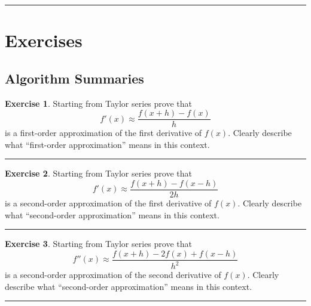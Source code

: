 \documentclass[
]{book}
\theoremstyle{definition}
\theoremstyle{definition}
\theoremstyle{definition}
\newtheorem{exercise}{Exercise}[chapter]
\theoremstyle{remark}
\begin{document}
\begin{center}\rule{0.5\linewidth}{0.5pt}\end{center}

\hypertarget{exercises-2}{%
\section{Exercises}\label{exercises-2}}

\hypertarget{algorithm-summaries-1}{%
\subsection{Algorithm Summaries}\label{algorithm-summaries-1}}

\begin{exercise}
\protect\hypertarget{exr:unnamed-chunk-249}{}{\label{exr:unnamed-chunk-249} }Starting from Taylor series prove that
\[f'(x) \approx \frac{f(x+h) - f(x)}{h}\] is a first-order approximation
of the first derivative of \(f(x)\). Clearly describe what ``first-order
approximation'' means in this context.
\end{exercise}

\begin{center}\rule{0.5\linewidth}{0.5pt}\end{center}

\begin{exercise}
\protect\hypertarget{exr:unnamed-chunk-250}{}{\label{exr:unnamed-chunk-250} }Starting from Taylor series prove that
\[f'(x) \approx \frac{f(x+h) - f(x-h)}{2h}\] is a second-order
approximation of the first derivative of \(f(x)\). Clearly describe what
``second-order approximation'' means in this context.
\end{exercise}

\begin{center}\rule{0.5\linewidth}{0.5pt}\end{center}

\begin{exercise}
\protect\hypertarget{exr:unnamed-chunk-251}{}{\label{exr:unnamed-chunk-251} }Starting from Taylor series prove that
\[f''(x) \approx \frac{f(x+h) - 2f(x) + f(x-h)}{h^2}\] is a second-order
approximation of the second derivative of \(f(x)\). Clearly describe what
``second-order approximation'' means in this context.
\end{exercise}

\begin{center}\rule{0.5\linewidth}{0.5pt}\end{center}
\end{document}
